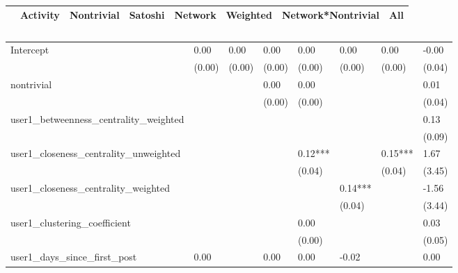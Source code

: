 \begin{table}
\caption{}
\begin{center}
\begin{tabular}{lccccccc}
\hline
                                      & Activity & Nontrivial & Satoshi & Network & Weighted & Network*Nontrivial &     All       \\
\hline
\hline
\end{tabular}
\begin{tabular}{llllllll}
Intercept                             & 0.00     & 0.00       & 0.00    & 0.00    & 0.00     & 0.00               & -0.00         \\
                                      & (0.00)   & (0.00)     & (0.00)  & (0.00)  & (0.00)   & (0.00)             & (0.04)        \\
nontrivial                            &          &            & 0.00    & 0.00    &          &                    & 0.01          \\
                                      &          &            & (0.00)  & (0.00)  &          &                    & (0.04)        \\
user1_betweenness_centrality_weighted &          &            &         &         &          &                    & 0.13          \\
                                      &          &            &         &         &          &                    & (0.09)        \\
user1_closeness_centrality_unweighted &          &            &         & 0.12*** &          & 0.15***            & 1.67          \\
                                      &          &            &         & (0.04)  &          & (0.04)             & (3.45)        \\
user1_closeness_centrality_weighted   &          &            &         &         & 0.14***  &                    & -1.56         \\
                                      &          &            &         &         & (0.04)   &                    & (3.44)        \\
user1_clustering_coefficient          &          &            &         & 0.00    &          &                    & 0.03          \\
                                      &          &            &         & (0.00)  &          &                    & (0.05)        \\
user1_days_since_first_post           & 0.00     &            & 0.00    & 0.00    & -0.02    &                    & 0.00          \\

\end{tabular}
\end{center}
\end{table}
